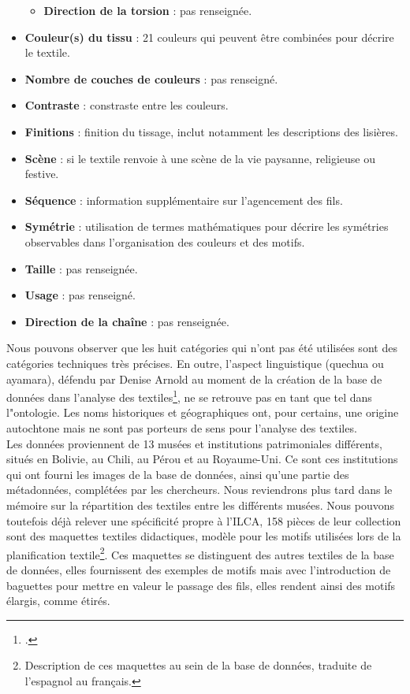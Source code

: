 \begin{citer}
\begin{itemize}
\begin{itemize}
			\item  \textbf{Direction de la torsion} : pas renseignée.
			\end{itemize}
		\item \textbf{Couleur(s) du tissu} : 21 couleurs qui peuvent être combinées pour décrire le textile.
		\item  \textbf{Nombre de couches de couleurs} : pas renseigné.
		\item  \textbf{Contraste} : constraste entre les couleurs.
		\item  \textbf{Finitions} : finition du tissage, inclut notamment les descriptions des lisières.
		\item  \textbf{Scène} : si le textile renvoie à une scène de la vie paysanne, religieuse ou festive.
		\item  \textbf{Séquence} : information supplémentaire sur l'agencement des fils.
		\item  \textbf{Symétrie} : utilisation de termes mathématiques pour décrire les symétries observables dans l'organisation des couleurs et des motifs.
		\item  \textbf{Taille} : pas renseignée.
		\item  \textbf{Usage} : pas renseigné.
		\item  \textbf{Direction de la chaîne} : pas renseignée.
	\end{itemize}
\end{citer}

Nous pouvons observer que les huit catégories qui n'ont pas été utilisées sont des catégories techniques très précises. En outre, l'aspect linguistique (quechua ou ayamara), défendu par Denise Arnold au moment de la création de la base de données dans l'analyse des textiles\footcite[p.~2]{brownlowOntologicalApproachCreating2015}, ne se retrouve pas en tant que tel dans l"ontologie. Les noms historiques et géographiques ont, pour certains, une origine autochtone mais ne sont pas porteurs de sens pour l'analyse des textiles.\\

Les données proviennent de 13 musées et institutions patrimoniales différents, situés en Bolivie, au Chili, au Pérou et au Royaume-Uni. Ce sont ces institutions qui ont fourni les images de la base de données, ainsi qu'une partie des métadonnées, complétées par les chercheurs. Nous reviendrons plus tard dans le mémoire sur la répartition des textiles entre les différents musées. Nous pouvons toutefois déjà relever une spécificité propre à l'ILCA, 158 pièces de leur collection sont des \og maquettes textiles didactiques, modèle pour les motifs utilisées lors de la planification textile\fg\footnote{Description de ces maquettes au sein de la base de données, traduite de l'espagnol au français.}. Ces maquettes se distinguent des autres textiles de la base de données, elles fournissent des exemples de motifs mais avec l'introduction de baguettes pour mettre en valeur le passage des fils, elles rendent ainsi des motifs élargis, comme étirés.


